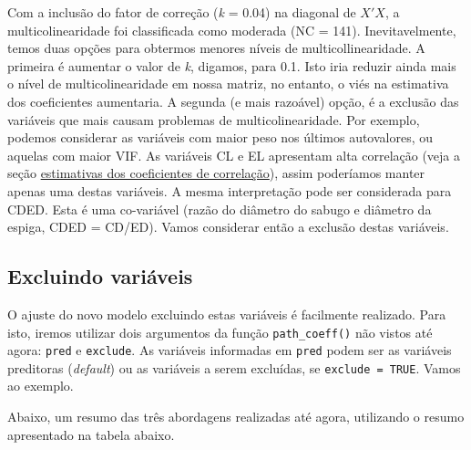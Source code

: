 \documentclass[
]{book}
\newenvironment{Shaded}{\begin{snugshade}}{\end{snugshade}}
\newcommand{\DataTypeTok}[1]{\textcolor[rgb]{0.13,0.29,0.53}{#1}}
\newcommand{\KeywordTok}[1]{\textcolor[rgb]{0.13,0.29,0.53}{\textbf{#1}}}
\newcommand{\NormalTok}[1]{#1}
\newcommand{\OperatorTok}[1]{\textcolor[rgb]{0.81,0.36,0.00}{\textbf{#1}}}
\newcommand{\OtherTok}[1]{\textcolor[rgb]{0.56,0.35,0.01}{#1}}
\newcommand{\StringTok}[1]{\textcolor[rgb]{0.31,0.60,0.02}{#1}}
\begin{document}
Com a inclusão do fator de correção (\emph{k} = 0.04) na diagonal de \(X'X\), a multicolinearidade foi classificada como moderada (NC = 141). Inevitavelmente, temos duas opções para obtermos menores níveis de multicollinearidade. A primeira é aumentar o valor de \emph{k}, digamos, para 0.1. Isto iria reduzir ainda mais o nível de multicolinearidade  em nossa matriz, no entanto, o viés na estimativa dos coeficientes aumentaria. A segunda (e mais razoável) opção, é a exclusão das variáveis que mais causam problemas de multicolinearidade. Por exemplo, podemos considerar as variáveis com maior peso nos últimos autovalores, ou aquelas com maior VIF. As variáveis CL e EL apresentam alta correlação (veja a seção \protect\hyperlink{estimativa-dos-coeficientes-de-correlacao}{estimativas dos coeficientes de correlação}), assim poderíamos manter apenas uma destas variáveis. A mesma interpretação pode ser considerada para CDED. Esta é uma co-variável (razão do diâmetro do sabugo e diâmetro da espiga, CDED = CD/ED). Vamos considerar então a exclusão destas variáveis.

\hypertarget{excluindo-variuxe1veis}{%
\subsection{Excluindo variáveis}\label{excluindo-variuxe1veis}}

O ajuste do novo modelo excluindo estas variáveis é facilmente realizado. Para isto, iremos utilizar dois argumentos da função \texttt{path\_coeff()}  não vistos até agora: \texttt{pred} e \texttt{exclude}. As variáveis informadas em \texttt{pred} podem ser as variáveis preditoras (\emph{default}) ou as variáveis a serem excluídas, se \texttt{exclude\ =\ TRUE}. Vamos ao exemplo.

\begin{Shaded}
\end{Shaded}

Abaixo, um resumo das três abordagens realizadas até agora, utilizando o resumo apresentado na tabela abaixo.
\end{document}
